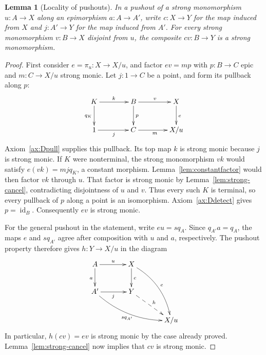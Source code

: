 \documentclass[11pt,a4paper]{article}
\theoremstyle{plain}
\newtheorem{lemma}[theorem]{Lemma}
\theoremstyle{definition}
\theoremstyle{remark}
\newcommand{\one}{1}
\newcommand{\id}{\operatorname{id}}
\begin{document}
\begin{lemma}[Locality of pushouts]\label{lem:pushoutlocality}
In a pushout of a strong monomorphism $u:A\to X$ along an epimorphism
$a:A\to A'$, write $c:X\to Y$ for the map induced from $X$ and $j:A'\to Y$
for the map induced from $A'$.
For every strong monomorphism $v:B\to X$ disjoint from $u$, the
composite $cv:B\to Y$ is a strong monomorphism.
\end{lemma}
\begin{proof}
First consider $e=\pi_u:X\to X/u$, and factor $ev=mp$ with
$p:B\to C$ epic and $m:C\to X/u$ strong monic.
Let $j:\one\to C$ be a point, and form its pullback along $p$:
\[
 \xymatrix@C=4em@R=2.5em{
K\ar[r]^k\ar[d]_{q_K}&B\ar[d]^p\ar[r]^v&X\ar[d]^e\\
 \one\ar[r]_j&C\ar[r]_m&X/u
 }
\]
Axiom~\ref{ax:Dpull} supplies this pullback. Its top map $k$ is
strong monic because $j$ is strong monic.
If $K$ were nonterminal, the strong monomorphism $vk$ would satisfy
$e(vk)=mj q_K$, a constant morphism. Lemma~\ref{lem:constantfactor}
would then factor $vk$ through $u$. That factor is strong monic by
Lemma~\ref{lem:strong-cancel},
contradicting disjointness of $u$ and $v$.
Thus every such $K$ is terminal, so every pullback of $p$ along a
point is an isomorphism. Axiom~\ref{ax:Ddetect} gives $p=\id_B$.
Consequently $ev$ is strong monic.

For the general pushout in the statement, write $eu=sq_A$.
Since $q_{A'}a=q_A$, the maps $e$ and $sq_{A'}$ agree after
composition with $u$ and $a$, respectively. The pushout property
therefore gives $h:Y\to X/u$ in the diagram
\[
\xymatrix@C=3.5em@R=2.5em{
A\ar[r]^u\ar[d]_a&X\ar[d]^c\ar@/^1pc/[ddr]^e&\\
A'\ar[r]_j\ar@/_1pc/[drr]_{s q_{A'}}&Y\ar@{-->}[dr]^h&\\
&&X/u
}
\]
In particular, $h(cv)=ev$ is strong monic by the case already
proved. Lemma~\ref{lem:strong-cancel} now implies that $cv$ is
strong monic.
\end{proof}
\end{document}
